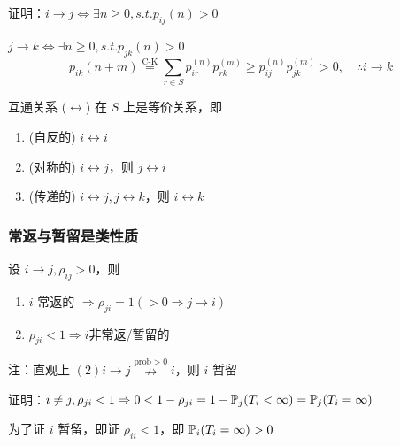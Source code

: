 证明：$i\to j\Leftrightarrow\exists n\geq 0,s.t. p_{ij}(n)>0$

$j\to k\Leftrightarrow\exists n\geq 0,s.t. p_{jk}(n)>0$
\[
p_{ik}(n+m)\overset{\text{C-K}}{=}\sum_{r\in S}p_{ir}^{(n)}p_{rk}^{(m)}\geq p_{ij}^{(n)}p_{jk}^{(m)}>0,\quad \therefore i\to k
\]

\begin{property}
    互通关系 ($\leftrightarrow$) 在 $S$ 上是等价关系，即
    \begin{enumerate}
        \item (自反的) $i\leftrightarrow i$
        \item (对称的) $i\leftrightarrow j$，则 $j\leftrightarrow i$
        \item (传递的) $i\leftrightarrow j, j\leftrightarrow k$，则 $i\leftrightarrow k$
    \end{enumerate}
\end{property}

\subsubsection{常返与暂留是类性质}

\begin{lemma}\label{lem:commu_recurrent}
    设 $i\to j,\rho_{ij}>0$，则
    \begin{enumerate}
        \item $i$ 常返的 $\Rightarrow \rho_{ji}=1(>0\Rightarrow j\to i)$ 
        \item $\rho_{ji}<1\Rightarrow i$非常返/暂留的
    \end{enumerate}
    注：直观上 $(2)i\to j\overset{\text{prob}>0}{\nrightarrow}i$，则 $i$ 暂留
\end{lemma}

证明：$i\neq j,\rho_{ji}<1\Rightarrow 0<1-\rho_{ji}=1-\mathbb{P}_j(T_i<\infty)=\mathbb{P}_j(T_i=\infty)$

为了证 $i$ 暂留，即证 $\rho_{ii}<1$，即 $\mathbb{P}_i(T_i=\infty)>0$

